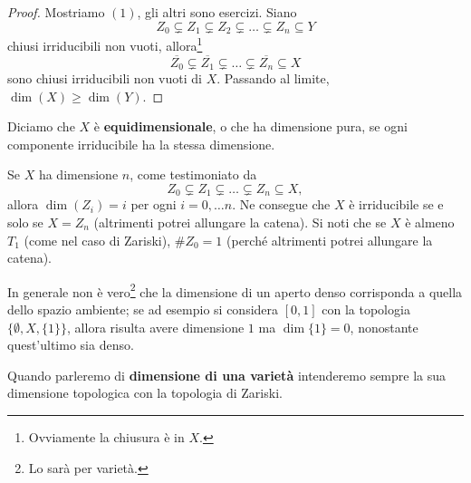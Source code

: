 \documentclass[twoside,openright,titlepage,numbers=noenddot,%
               headinclude,footinclude,cleardoublepage=empty,abstract=on,
               BCOR=23mm,paper=letter,fontsize=11pt
               ]{scrreprt}
\begin{document}
\begin{proof}
    Mostriamo $(1)$, gli altri sono esercizi. Siano
    \[ Z_0 \subsetneq Z_1 \subsetneq Z_2 \subsetneq \dots \subsetneq Z_n \subseteq Y \]
    chiusi irriducibili non vuoti, allora\footnote{Ovviamente la chiusura è in $X$.}
    \[ \overline{Z_0} \subsetneq \overline{Z_1} \subsetneq \dots \subsetneq \overline{Z_n} \subseteq X \]
    sono chiusi irriducibili non vuoti di $X$. Passando al limite, $\dim(X) \geq \dim(Y)$.
\end{proof}
\begin{definition}
    Diciamo che $X$ è \textbf{equidimensionale}, o che ha dimensione pura, se ogni componente irriducibile ha la stessa dimensione.
\end{definition}
\begin{remark}
    Se $X$ ha dimensione $n$, come testimoniato da
    \[ Z_0 \subsetneq Z_1 \subsetneq \dots \subsetneq Z_n \subseteq X, \]
    allora $\dim(Z_i) = i$ per ogni $i = 0, \dots n$. Ne consegue che $X$ è irriducibile se e solo se $X = Z_n$ (altrimenti potrei allungare la catena). Si noti che se $X$ è almeno $T_1$ (come nel caso di Zariski), $\#Z_0 = 1$ (perché altrimenti potrei allungare la catena).
\end{remark}
\begin{example}
    In generale non è vero\footnote{Lo sarà per varietà.} che la dimensione di un aperto denso corrisponda a quella dello spazio ambiente; se ad esempio si considera $[0,1]$ con la topologia $\{\emptyset, X, \{1\}\}$, allora risulta avere dimensione $1$ ma $\dim \{1\} = 0$, nonostante quest'ultimo sia denso.
\end{example}
Quando parleremo di \textbf{dimensione di una varietà} intenderemo sempre la sua dimensione topologica con la topologia di Zariski.
\end{document}
